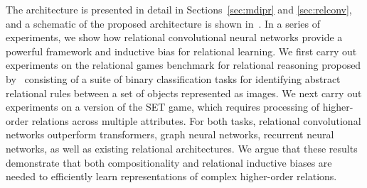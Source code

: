 The architecture is presented in detail in Sections~\ref{sec:mdipr} and \ref{sec:relconv}, and a schematic of the proposed architecture is shown in~. In a series of experiments, we show how relational convolutional neural networks provide a powerful framework and inductive bias for relational learning. We first carry out experiments on the relational games benchmark for relational reasoning proposed by~\citep{shanahanExplicitlyRelationalNeural} consisting of a suite of binary classification tasks for identifying abstract relational rules between a set of objects represented as images. We next carry out experiments on a version of the SET game, which requires processing of higher-order relations across multiple attributes. For both tasks, relational convolutional networks outperform transformers, graph neural networks, recurrent neural networks, as well as existing relational architectures. We argue that these results demonstrate that both compositionality and relational inductive biases are needed to efficiently learn representations of complex higher-order relations.

